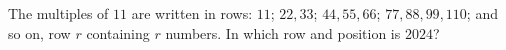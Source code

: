 The multiples of $11$ are written in rows: $11$; $22,33$; $44,55,66$; $77,88,99,110$; and so on, row $r$ containing $r$ numbers. In which row and position is $2024$?
